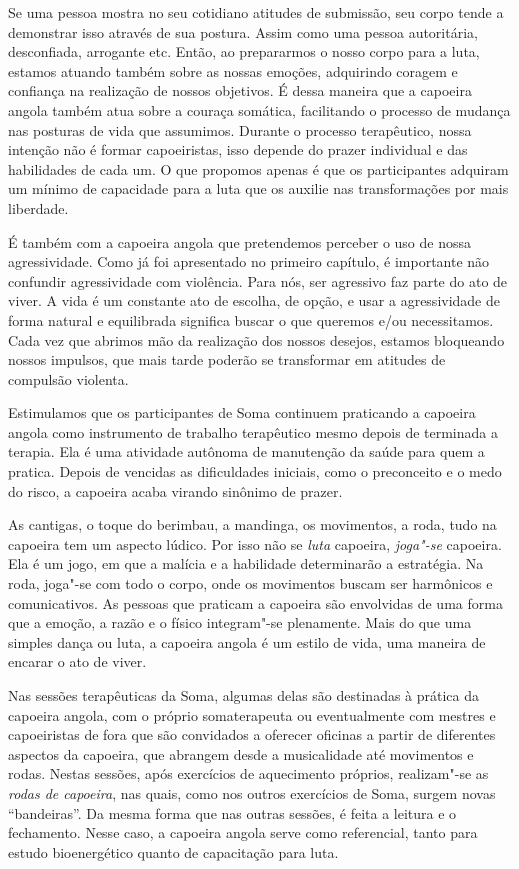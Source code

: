 Se uma pessoa mostra no seu cotidiano atitudes de submissão, seu corpo
tende a demonstrar isso através de sua postura. Assim como uma pessoa
autoritária, desconfiada, arrogante etc. Então, ao prepararmos o nosso
corpo para a luta, estamos atuando também sobre as nossas emoções,
adquirindo coragem e confiança na realização de nossos objetivos. É
dessa maneira que a capoeira angola também atua sobre a couraça
somática, facilitando o processo de mudança nas posturas de vida que
assumimos. Durante o processo terapêutico, nossa intenção não é formar
capoeiristas, isso depende do prazer individual e das habilidades de
cada um. O que propomos apenas é que os participantes adquiram um mínimo
de capacidade para a luta que os auxilie nas transformações por mais
liberdade.

É também com a capoeira angola que pretendemos perceber o uso de nossa
agressividade. Como já foi apresentado no primeiro capítulo, é
importante não confundir agressividade com violência. Para nós, ser
agressivo faz parte do ato de viver. A vida é um constante ato de
escolha, de opção, e usar a agressividade de forma natural e equilibrada
significa buscar o que queremos e/ou necessitamos. Cada vez que abrimos
mão da realização dos nossos desejos, estamos bloqueando nossos
impulsos, que mais tarde poderão se transformar em atitudes de compulsão
violenta.

Estimulamos que os participantes de Soma continuem praticando a capoeira
angola como instrumento de trabalho terapêutico mesmo depois de
terminada a terapia. Ela é uma atividade autônoma de manutenção da saúde
para quem a pratica. Depois de vencidas as dificuldades iniciais, como o
preconceito e o medo do risco, a capoeira acaba virando sinônimo de
prazer.

As cantigas, o toque do berimbau, a mandinga, os movimentos, a roda,
tudo na capoeira tem um aspecto lúdico. Por isso não se \emph{luta}
capoeira, \emph{joga"-se} capoeira. Ela é um jogo, em que a malícia e a
habilidade determinarão a estratégia. Na roda, joga"-se com todo o corpo,
onde os movimentos buscam ser harmônicos e comunicativos. As pessoas que
praticam a capoeira são envolvidas de uma forma que a emoção, a razão e
o físico integram"-se plenamente. Mais do que uma simples dança ou luta,
a capoeira angola é um estilo de vida, uma maneira de encarar o ato de
viver.

Nas sessões terapêuticas da Soma, algumas delas são destinadas à prática
da capoeira angola, com o próprio somaterapeuta ou eventualmente com
mestres e capoeiristas de fora que são convidados a oferecer oficinas a
partir de diferentes aspectos da capoeira, que abrangem desde a
musicalidade até movimentos e rodas. Nestas sessões, após exercícios de
aquecimento próprios, realizam"-se as \emph{rodas de capoeira}, nas quais,
como nos outros exercícios de Soma, surgem novas ``bandeiras''. Da mesma
forma que nas outras sessões, é feita a leitura e o fechamento. Nesse
caso, a capoeira angola serve como referencial, tanto para estudo
bioenergético quanto de capacitação para luta.

